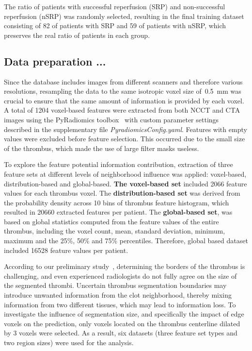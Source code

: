 \documentclass[preprint,12pt]{elsarticle}
\begin{document}
The ratio of patients with successful reperfusion (SRP) and non-successful reperfusion (nSRP) was randomly selected, resulting in the final training dataset consisting of 82 of patients with SRP and 59 of patients with nSRP, which preserves the real ratio of patients in each group.  


\subsection{Data preparation ...}

Since the database includes images from different scanners and therefore various resolutions, resampling the data to the same isotropic voxel size of~0.5~mm was crucial to ensure that the same amount of information is provided by each voxel. A total of 1204 voxel-based features were extracted from both NCCT and CTA images using the PyRadiomics toolbox~\cite{VanGriethuysen20171031} with custom parameter settings described in the supplementary file \textit{PyradiomicsConfig.yaml}. Features with empty values were excluded before feature selection. This occurred due to the small size of the thrombus, which made the use of large filter masks useless. 

To explore the feature potential information contribution, extraction of three feature sets at different levels of neighborhood influence was applied: voxel-based, distribution-based and global-based. \textbf{The voxel-based set} included 2066 feature values for each thrombus voxel. The \textbf{distribution-based set} was derived from the probability density across 10 bins of thrombus feature histogram, which resulted in 20660 extracted features per patient. The \textbf{global-based set}, was based on global statistics computed from the feature values of the entire thrombus, including the voxel count, mean, standard deviation, minimum, maximum and the 25\%, 50\% and 75\% percentiles. Therefore, global based dataset included 16528 feature values per patient.  

According to our preliminary study~\cite{Nemcekova2024}, determining the borders of the thrombus is challenging, and even experienced radiologists do not fully agree on the size of the segmented thrombi. Uncertain thrombus segmentation boundaries may introduce unwanted information from the clot neighborhood, thereby mixing information from two different tissues, which may lead to information loss. To investigate the influence of segmentation size, and specifically the impact of edge voxels on the prediction, only voxels located on the thrombus centerline dilated by 3 voxels were selected. As a result, six datasets (three feature set types and two region sizes) were used for the analysis.
\end{document}
